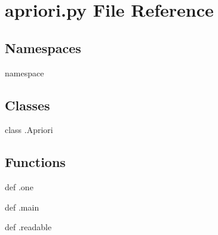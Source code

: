\section{apriori.py File Reference}
\label{apriori_8py}
\subsection*{Namespaces}
\begin{CompactItemize}
\item 
namespace {\bfapriori}
\end{CompactItemize}
\subsection*{Classes}
\begin{CompactItemize}
\item 
class {\bfapriori.Apriori}
\end{CompactItemize}
\subsection*{Functions}
\begin{CompactItemize}
\item 
def {\bfapriori.one}
\item 
def {\bfapriori.main}
\item 
def {\bfapriori.readable}
\end{CompactItemize}
